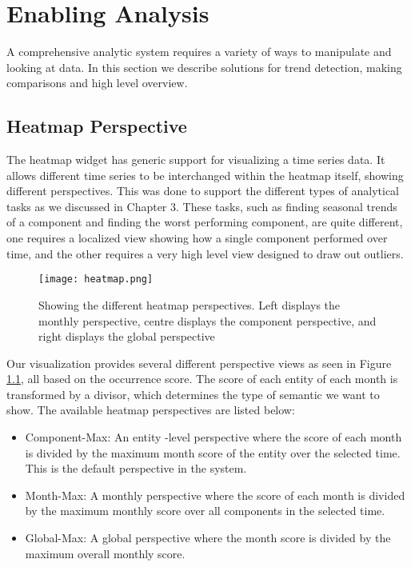 %
\chapter{Enabling Analysis}
A comprehensive analytic system requires a variety of ways to manipulate and
looking at data. In this section we describe solutions for trend detection,
making comparisons and high level overview.
 

\section{Heatmap Perspective}
The heatmap widget has generic support for visualizing a time series data. It 
allows different time series to be interchanged within the heatmap itself, showing 
different perspectives. This was done to support the different types of
analytical tasks as we discussed in Chapter 3. These tasks, such as
finding seasonal trends of a component and finding the worst performing
component, are quite different, one requires a localized view showing how a
single component performed over time, and the other requires a very high level
view designed to draw out outliers.

	\begin{figure}
	 \centering  
	 \texttt{[image: heatmap.png]}
	 \caption[Heatmap Perspectives]{Showing the different heatmap perspectives. Left
	 displays the monthly perspective, centre displays the component perspective, and right displays the
	 global perspective}
	 \label{figure:heatmap}
	\end{figure}


Our visualization provides several different perspective views as seen in
Figure \ref{figure:heatmap}, all based on the occurrence score. The score of
each entity of each month is transformed by a divisor, which determines the
type of semantic we want to show. The available heatmap perspectives are listed below:

\begin{itemize} [noitemsep]
  \item Component-Max: An entity -level perspective where the score of
  each month is divided by the maximum month score of the entity over the
  selected time. This is the default perspective in the system.
  
  \item Month-Max: A monthly perspective where the score of each month is 
  divided by the maximum monthly score over all components in the selected time.
  
  \item Global-Max: A global perspective where the month score is divided by the
  maximum overall monthly score.
\end{itemize}
 
